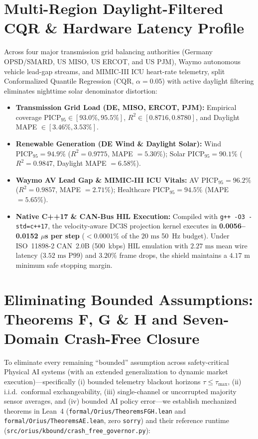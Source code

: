 \section{Multi-Region Daylight-Filtered CQR \& Hardware Latency Profile}
Across four major transmission grid balancing authorities (Germany OPSD/SMARD, US MISO, US ERCOT, and US PJM), Waymo autonomous vehicle lead-gap streams, and MIMIC-III ICU heart-rate telemetry, split Conformalized Quantile Regression (CQR, $\alpha=0.05$) with active daylight filtering eliminates nighttime solar denominator distortion:
\begin{itemize}
    \item \textbf{Transmission Grid Load (DE, MISO, ERCOT, PJM):} Empirical coverage $\mathrm{PICP}_{95} \in [93.0\%, 95.5\%]$, $R^2 \in [0.8716, 0.8780]$, and Daylight MAPE $\in [3.46\%, 3.53\%]$.
    \item \textbf{Renewable Generation (DE Wind \& Daylight Solar):} Wind $\mathrm{PICP}_{95} = 94.9\%$ ($R^2 = 0.9775$, MAPE $= 5.30\%$); Solar $\mathrm{PICP}_{95} = 90.1\%$ ($R^2 = 0.9847$, Daylight MAPE $= 6.58\%$).
    \item \textbf{Waymo AV Lead Gap \& MIMIC-III ICU Vitals:} AV $\mathrm{PICP}_{95} = 96.2\%$ ($R^2 = 0.9857$, MAPE $= 2.71\%$); Healthcare $\mathrm{PICP}_{95} = 94.5\%$ (MAPE $= 5.65\%$).
    \item \textbf{Native C++17 \& CAN-Bus HIL Execution:} Compiled with \texttt{g++ -O3 -std=c++17}, the velocity-aware DC3S projection kernel executes in \textbf{0.0056--0.0152 $\mu$s per step} ($<0.0001\%$ of the $20\text{ ms}$ 50~Hz budget). Under ISO~11898-2 CAN~2.0B (500~kbps) HIL emulation with $2.27\text{ ms}$ mean wire latency ($3.52\text{ ms}$ P99) and $3.20\%$ frame drops, the shield maintains a $4.17\text{ m}$ minimum safe stopping margin.
\end{itemize}

\section{Eliminating Bounded Assumptions: Theorems F, G \& H and Seven-Domain Crash-Free Closure}
To eliminate every remaining ``bounded'' assumption across safety-critical Physical AI systems (with an extended generalization to dynamic market execution)---specifically (i) bounded telemetry blackout horizons $\tau \le \tau_{\max}$, (ii) i.i.d.\ conformal exchangeability, (iii) single-channel or uncorrupted majority sensor averages, and (iv) bounded AI policy error---we establish mechanized theorems in Lean~4 (\texttt{formal/\allowbreak Orius/\allowbreak TheoremsFGH.lean} and \texttt{formal/\allowbreak Orius/\allowbreak TheoremsAE.lean}, zero \texttt{sorry}) and their reference runtime (\texttt{src/\allowbreak orius/\allowbreak kbound/\allowbreak crash\_\allowbreak free\_\allowbreak governor.py}):

